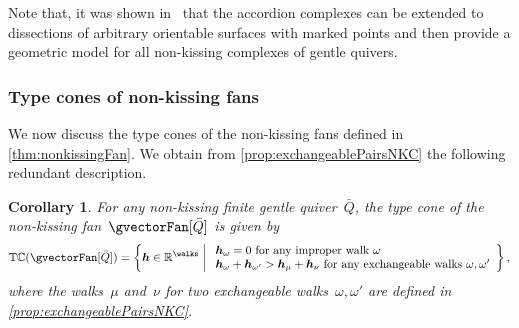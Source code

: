 \documentclass{amsart}
\newtheorem{corollary}[theorem]{Corollary}
\theoremstyle{definition}
\newcommand{\R}{\mathbb{R}} %
\renewcommand{\b}[1]{{\boldsymbol{#1}}} %
\newcommand{\set}[2]{\left\{ #1 \;\middle|\; #2 \right\}} %
\newcommand{\typeCone}{\mathbb{TC}} %
\newcommand{\quiver}{\bar Q} %
\begin{document}
Note that, it was shown in~\cite{PaluPilaudPlamondon-surfaces} that the accordion complexes can be extended to dissections of arbitrary orientable surfaces with marked points and then provide a geometric model for all non-kissing complexes of gentle quivers.

\subsubsection{Type cones of non-kissing fans}

We now discuss the type cones of the non-kissing fans defined in \cref{thm:nonkissingFan}. We obtain from \cref{prop:exchangeablePairsNKC} the following redundant description.

\begin{corollary}
For any non-kissing finite gentle quiver~$\quiver$, the type cone of the non-kissing fan~$\gvectorFan[\quiver]$ is given by
\[
\typeCone(\gvectorFan[\quiver]) = \set{\b{h} \in \R^{\walks}}{\begin{array}{l} \b{h}_\omega = 0 \text{ for any improper walk } \omega \\ \b{h}_\omega + \b{h}_{\omega'} > \b{h}_\mu + \b{h}_\nu \text{ for any exchangeable walks } \omega, \omega' \end{array}},
\]
where the walks~$\mu$ and~$\nu$ for two exchangeable walks~$\omega, \omega'$ are defined in \cref{prop:exchangeablePairsNKC}.
\end{corollary}
\end{document}
